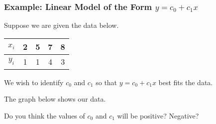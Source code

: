 \begin{frame}
\frametitle{Example: Linear Model of the Form $y = c_0 + c_1x$}

    Suppose we are given the data below. 
    \begin{center}
    \begin{tabular}{c|cccc} 
    $ x_i$ & 2 & 5 & 7 & 8 
    \\ \hline 
    $ y_i$ & 1 & 1 & 4 & 3 
    \end{tabular}
    \end{center}
    
    We wish to identify $c_0$ and $c_1$ so that $ y= c_0 + c_1 x$ best fits the data.
    
    \vspace{6pt}
    
    \pause
    The graph below shows our data. 
    \begin{center}
    
    Do you think the values of $c_0$ and $c_1$ will be positive? Negative? 
    
    \end{center} 

\end{frame}
 
